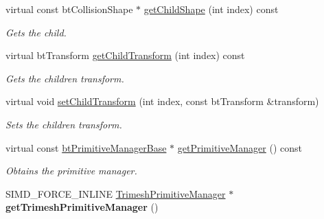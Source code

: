 \begin{DoxyCompactItemize}
\mbox{\label{classbtGImpactMeshShapePart_acd6de27502bdfbb0a87b4a2fe968fe1e}} 
virtual const bt\+Collision\+Shape $\ast$ \hyperlink{classbtGImpactMeshShapePart_acd6de27502bdfbb0a87b4a2fe968fe1e}{get\+Child\+Shape} (int index) const
\begin{DoxyCompactList}\small\item\em Gets the child. \end{DoxyCompactList}\item 
\mbox{\label{classbtGImpactMeshShapePart_a03e59197abe75fe7b054e5a3a9c51278}} 
virtual bt\+Transform \hyperlink{classbtGImpactMeshShapePart_a03e59197abe75fe7b054e5a3a9c51278}{get\+Child\+Transform} (int index) const
\begin{DoxyCompactList}\small\item\em Gets the children transform. \end{DoxyCompactList}\item 
virtual void \hyperlink{classbtGImpactMeshShapePart_a0a97d3769fb7d3f583e41da6b284bcc1}{set\+Child\+Transform} (int index, const bt\+Transform \&transform)
\begin{DoxyCompactList}\small\item\em Sets the children transform. \end{DoxyCompactList}\item 
\mbox{\label{classbtGImpactMeshShapePart_addf40f1b9524952475789da7451e9575}} 
virtual const \hyperlink{classbtPrimitiveManagerBase}{bt\+Primitive\+Manager\+Base} $\ast$ \hyperlink{classbtGImpactMeshShapePart_addf40f1b9524952475789da7451e9575}{get\+Primitive\+Manager} () const
\begin{DoxyCompactList}\small\item\em Obtains the primitive manager. \end{DoxyCompactList}\item 
\mbox{\label{classbtGImpactMeshShapePart_a7b6bceae8902afd9d35a734899f07c7b}} 
S\+I\+M\+D\+\_\+\+F\+O\+R\+C\+E\+\_\+\+I\+N\+L\+I\+NE \hyperlink{classbtGImpactMeshShapePart_1_1TrimeshPrimitiveManager}{Trimesh\+Primitive\+Manager} $\ast$ {\bfseries get\+Trimesh\+Primitive\+Manager} ()
\item 
\mbox{\label{classbtGImpactMeshShapePart_a1bcf320959ca5e5472c1464a32efafcf}} 

\end{DoxyCompactItemize}
